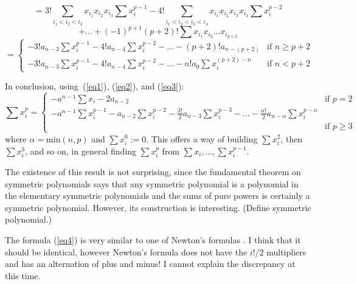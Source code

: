 \begin{equation}
\label{eq3}
= 3! \sum_{i_{1} < i_{2} < i_{3}} x_{i_{1}} x_{i_{2}} x_{i_{3}} 
	\sum x_{i}^{p-1}
- 4! \sum_{i_{1} < i_{2} < i_{3} < i_{4}} x_{i_{1}} x_{i_{2}} x_{i_{3}} x_{i_{4}}
	\sum x_{i}^{p-2} 
\end{equation}
\[ + \ldots
   + (-1)^{p+1} (p+2)! \sum x_{i_{1}} x_{i_{2}} \ldots x_{i_{p+2}}
\]
\[ = \left\{ \begin{array}{ll}
		- 3! a_{n-3} \sum x_{i}^{p-1}
	 	- 4! a_{n-4} \sum x_{i}^{p-2}
		- \ldots
		- (p+2)! a_{n-(p+2)}			& \mbox{if $n \geq p+2$} \\
		
		- 3! a_{n-3} \sum x_{i}^{p-1}
	 	- 4! a_{n-4} \sum x_{i}^{p-2}
		- \ldots
		- n!a_{0}    \sum x_{i}^{(p+2)-n}	& \mbox{if $n < p+2$}
	     \end{array}
     \right.  \]

In conclusion, using~(\ref{eq1}), (\ref{eq2}), and (\ref{eq3}):
\begin{equation}
\label{eq4}
\sum x_{i}^{p} = \left\{ \begin{array}{ll}
		- a^{n-1} \sum x_{i} - 2 a_{n-2}  & \mbox{if $p = 2$} \\
		- a^{n-1} \sum x_{i}^{p-1} 
	 	- a_{n-2} \sum x_{i}^{p-2} 
	    - \frac{3!}{2} a_{n-3} \sum x_{i}^{p-3}
	    - \ldots
	    - \frac{\alpha !}{2} a_{n-\alpha} \sum x_{i}^{p-\alpha} \\
							& \mbox{if $p \geq 3$}
			  \end{array} \right. 
\end{equation}
where $\alpha = \mbox{min}(n,p)$ and $\sum x_{i}^{0} :=0$.
This offers a way of building $\sum x_{i}^{2}$, then $\sum x_{i}^{3}$, and so on,
in general finding $\sum x_{i}^{p}$ from $\sum x_{i}, \ldots, \sum x_{i}^{p-1}$.
\QED

The existence of this result is not surprising, 
since the fundamental theorem on symmetric polynomials \cite{Hernstein}
says that any symmetric polynomial is a polynomial in the elementary symmetric polynomials
and the sums of pure powers is certainly a symmetric polynomial.
However, its construction is interesting.
(Define symmetric polynomial.)

The formula (\ref{eq4}) is very similar to one of Newton's formulas \cite[p. 323]{Kurosh}.
I think that it should be identical, 
however Newton's formula does not have the $i!/2$ multipliers and has an alternation
of plus and minus!
I cannot explain the discrepancy at this time.

